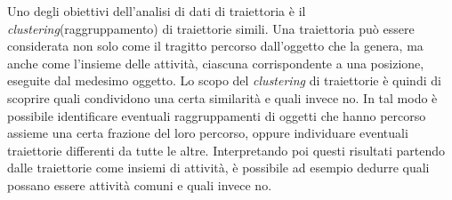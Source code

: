 Uno degli obiettivi dell'analisi di dati di traiettoria è il \textit{clustering}(raggruppamento) di traiettorie simili.
Una traiettoria può essere considerata non solo come il tragitto percorso dall'oggetto che la genera,
ma anche come l'insieme delle attività, ciascuna corrispondente a una posizione, eseguite dal medesimo oggetto.
Lo scopo del \textit{clustering} di traiettorie è quindi di scoprire quali condividono una certa similarità e quali invece no.
In tal modo è possibile identificare eventuali raggruppamenti di oggetti che hanno percorso assieme una certa frazione del loro percorso, oppure individuare eventuali
traiettorie differenti da tutte le altre.
Interpretando poi questi risultati partendo dalle traiettorie come insiemi di attività, è possibile ad esempio dedurre quali possano essere attività comuni e quali invece no.
